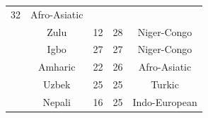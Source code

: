 {\begin{tabular}{|c|c|c|c|c|}
32 &
	

Afro-Asiatic \\
	\thetablecount\stepcounter{tablecount} &

Zulu &
	

12 &
	

28 &
	

Niger-Congo \\
	\thetablecount\stepcounter{tablecount} &

Igbo &
	

27 &
	

27 &
	

Niger-Congo \\
	\thetablecount\stepcounter{tablecount} &

Amharic &
	

22 &
	

26 &
	

Afro-Asiatic \\
	\thetablecount\stepcounter{tablecount} &

Uzbek &
	

25 &
	

25 &
	

Turkic \\
	\thetablecount\stepcounter{tablecount} &

Nepali &
	

16 &
	

25 &
	

Indo-European \\
\hline
\end{tabular}
}

